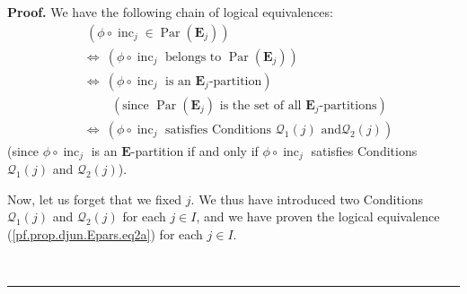 \documentclass[numbers=enddot,12pt,final,onecolumn,notitlepage,abstracton]{scrartcl}
\theoremstyle{definition}
\newenvironment{proof}[1][Proof]{\noindent\textbf{#1.} }{\ \rule{0.5em}{0.5em}}
\newenvironment{verlong}{}{}
\begin{document}
\begin{verlong}
\begin{footnotesize}
\begin{proof}
We have the following chain of logical equivalences:%
\begin{align}
&  \ \left(  \phi\circ\operatorname*{inc}\nolimits_{j}\in\operatorname*{Par}%
\left(  \mathbf{E}_{j}\right)  \right) \nonumber\\
&  \Longleftrightarrow\ \left(  \phi\circ\operatorname*{inc}\nolimits_{j}%
\text{ belongs to }\operatorname*{Par}\left(  \mathbf{E}_{j}\right)  \right)
\nonumber\\
&  \Longleftrightarrow\ \left(  \phi\circ\operatorname*{inc}\nolimits_{j}%
\text{ is an }\mathbf{E}_{j}\text{-partition}\right) \nonumber\\
&  \ \ \ \ \ \ \ \ \ \ \left(  \text{since }\operatorname*{Par}\left(
\mathbf{E}_{j}\right)  \text{ is the set of all }\mathbf{E}_{j}%
\text{-partitions}\right) \nonumber\\
&  \Longleftrightarrow\ \left(  \phi\circ\operatorname*{inc}\nolimits_{j}%
\text{ satisfies Conditions }\mathcal{Q}_{1}\left(  j\right)  \text{ and
}\mathcal{Q}_{2}\left(  j\right)  \right)  \label{pf.prop.djun.Epars.eq2a}%
\end{align}
(since $\phi\circ\operatorname*{inc}\nolimits_{j}$ is an $\mathbf{E}%
$-partition if and only if $\phi\circ\operatorname*{inc}\nolimits_{j}$
satisfies Conditions $\mathcal{Q}_{1}\left(  j\right)  $ and $\mathcal{Q}%
_{2}\left(  j\right)  $).

Now, let us forget that we fixed $j$. We thus have introduced two Conditions
$\mathcal{Q}_{1}\left(  j\right)  $ and $\mathcal{Q}_{2}\left(  j\right)  $
for each $j\in I$, and we have proven the logical equivalence
(\ref{pf.prop.djun.Epars.eq2a}) for each $j\in I$.


\end{proof}
\end{footnotesize}
\end{verlong}
\end{document}

